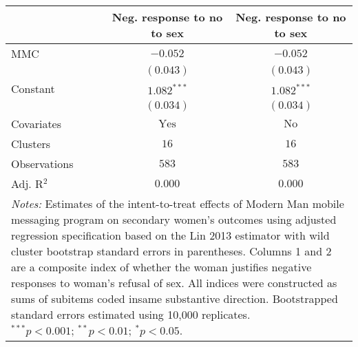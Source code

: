 
\begin{tabular}{l c c}
\toprule
 & Neg. response to no to sex & Neg. response to no to sex \\
\midrule
MMC          & $-0.052$       & $-0.052$      \\
             & $(0.043)$      & $(0.043)$     \\
Constant     & $1.082^{***}$  & $1.082^{***}$ \\
             & $(0.034)$      & $(0.034)$     \\
\midrule
Covariates   & $\textrm{Yes}$ & $\textrm{No}$ \\
Clusters     & $16$           & $16$          \\
Observations & $583$          & $583$         \\
Adj. R$^2$   & $0.000$        & $0.000$       \\
\bottomrule
\multicolumn{3}{l}{\scriptsize{\parbox{\linewidth}{\vspace{2pt}
       \textit{Notes:} Estimates of the intent-to-treat effects of Modern Man mobile
       messaging program on secondary women's outcomes using adjusted regression
       specification based on the Lin 2013 estimator with wild cluster bootstrap
       standard errors in parentheses. Columns 1 and 2 are a composite index of
       whether the woman justifies negative responses to woman's refusal of sex. All indices were
       constructed as sums of subitems coded insame substantive direction. 
       Bootstrapped standard errors estimated using 10,000 replicates. \\ $^{***}p<0.001$; $^{**}p<0.01$; $^{*}p<0.05$.}}}
\end{tabular}
